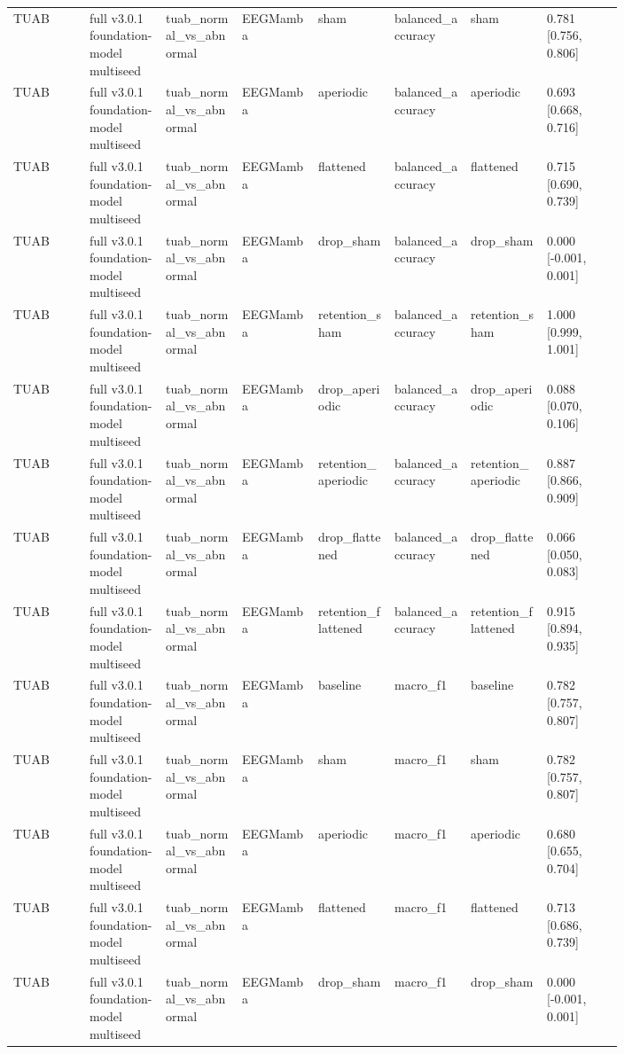 \begin{longtable}{p{0.10\linewidth}p{0.10\linewidth}p{0.10\linewidth}p{0.10\linewidth}p{0.10\linewidth}p{0.10\linewidth}p{0.10\linewidth}p{0.10\linewidth}}
TUAB & full v3.0.1 foundation-model multiseed & tuab\_normal\_vs\_abnormal & EEGMamba & sham & balanced\_accuracy & sham & 0.781 [0.756, 0.806]\\
TUAB & full v3.0.1 foundation-model multiseed & tuab\_normal\_vs\_abnormal & EEGMamba & aperiodic & balanced\_accuracy & aperiodic & 0.693 [0.668, 0.716]\\
TUAB & full v3.0.1 foundation-model multiseed & tuab\_normal\_vs\_abnormal & EEGMamba & flattened & balanced\_accuracy & flattened & 0.715 [0.690, 0.739]\\
TUAB & full v3.0.1 foundation-model multiseed & tuab\_normal\_vs\_abnormal & EEGMamba & drop\_sham & balanced\_accuracy & drop\_sham & 0.000 [-0.001, 0.001]\\
TUAB & full v3.0.1 foundation-model multiseed & tuab\_normal\_vs\_abnormal & EEGMamba & retention\_sham & balanced\_accuracy & retention\_sham & 1.000 [0.999, 1.001]\\
TUAB & full v3.0.1 foundation-model multiseed & tuab\_normal\_vs\_abnormal & EEGMamba & drop\_aperiodic & balanced\_accuracy & drop\_aperiodic & 0.088 [0.070, 0.106]\\
TUAB & full v3.0.1 foundation-model multiseed & tuab\_normal\_vs\_abnormal & EEGMamba & retention\_aperiodic & balanced\_accuracy & retention\_aperiodic & 0.887 [0.866, 0.909]\\
TUAB & full v3.0.1 foundation-model multiseed & tuab\_normal\_vs\_abnormal & EEGMamba & drop\_flattened & balanced\_accuracy & drop\_flattened & 0.066 [0.050, 0.083]\\
TUAB & full v3.0.1 foundation-model multiseed & tuab\_normal\_vs\_abnormal & EEGMamba & retention\_flattened & balanced\_accuracy & retention\_flattened & 0.915 [0.894, 0.935]\\
TUAB & full v3.0.1 foundation-model multiseed & tuab\_normal\_vs\_abnormal & EEGMamba & baseline & macro\_f1 & baseline & 0.782 [0.757, 0.807]\\
TUAB & full v3.0.1 foundation-model multiseed & tuab\_normal\_vs\_abnormal & EEGMamba & sham & macro\_f1 & sham & 0.782 [0.757, 0.807]\\
TUAB & full v3.0.1 foundation-model multiseed & tuab\_normal\_vs\_abnormal & EEGMamba & aperiodic & macro\_f1 & aperiodic & 0.680 [0.655, 0.704]\\
TUAB & full v3.0.1 foundation-model multiseed & tuab\_normal\_vs\_abnormal & EEGMamba & flattened & macro\_f1 & flattened & 0.713 [0.686, 0.739]\\
TUAB & full v3.0.1 foundation-model multiseed & tuab\_normal\_vs\_abnormal & EEGMamba & drop\_sham & macro\_f1 & drop\_sham & 0.000 [-0.001, 0.001]\\

\end{longtable}
